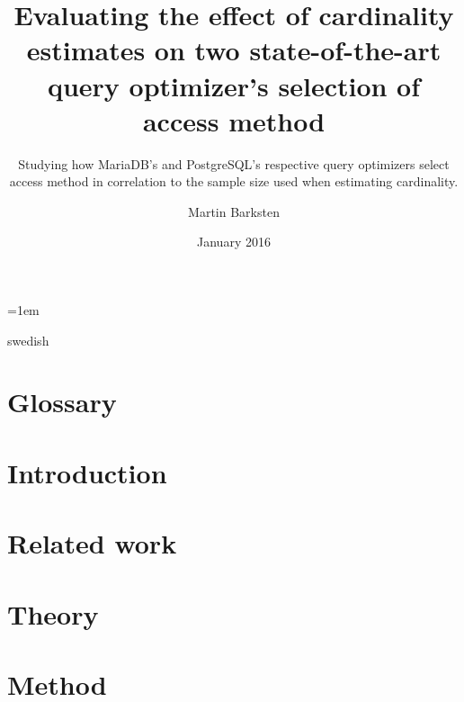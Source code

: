 \documentclass[a4paper,11pt]{kth-mag}
\title{Evaluating the effect of cardinality estimates on two state-of-the-art query optimizer's selection of access method}
\subtitle{Studying how MariaDB's and PostgreSQL's respective query optimizers
  select access method in correlation to the sample size used when estimating cardinality.}
\author{Martin Barksten}
\date{January 2016}
\begin{document}
\lstset{basicstyle=\ttfamily,breaklines=true}
\lstset{frame=lines}
\emergencystretch=1em
\pgfplotsset{width=10cm, compat=1.9}
\tabulinesep=1.2mm

\newcommand{\clj}[1]{\texttt{#1}}
\newcommand{\sql}[1]{\texttt{#1}}
\newenvironment{indexgraph}{
  \begin{tikzpicture}
    \begin{axis}[
      ybar,
      legend style={at={(0.5,-0.15)},
        anchor=north,legend columns=-1},
      symbolic x coords={ct,t,mt,mm,book,cmt,cmm,est,resamb},
      ylabel={\#index},
      xtick=data,
      nodes near coords,
      nodes near coords align={vertical},
      width=14cm]
} {
  \legend{Possible access methods, MariaDB, PostgreSQL}
\end{axis}
\end{tikzpicture}
}

\frontmatter
\pagestyle{empty}
\removepagenumbers{}
\maketitle
{}
\begin{abstract}
    
\end{abstract}
\clearpage
\begin{foreignabstract}{swedish}
    
\end{foreignabstract}
\clearpage
\tableofcontents*
\clearpage
\listoffigures
\mainmatter{}
\pagestyle{newchap}

\chapter{Glossary}\label{chap:glossary}
    
\chapter{Introduction}\label{chap:introduction}
    
\chapter{Related work}\label{chap:relatedwork}
    
\chapter{Theory}\label{chap:theory}
    
\chapter{Method}\label{chap:method}
    
\end{document}
